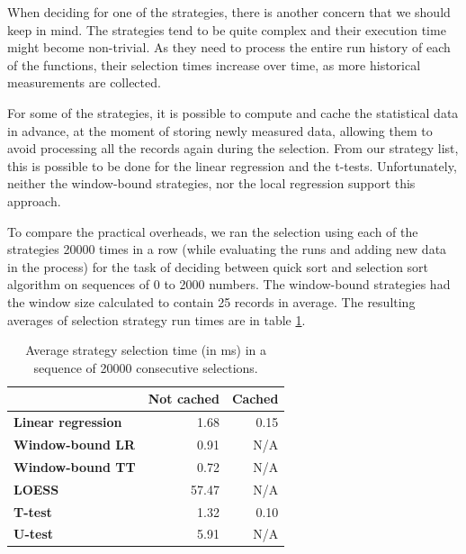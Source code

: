 When deciding for one of the strategies, there is another concern that we should keep in mind. The strategies tend to be quite complex and their execution time might become non-trivial. As they need to process the entire run history of each of the functions, their selection times increase over time, as more historical measurements are collected.

For some of the strategies, it is possible to compute and cache the statistical data in advance, at the moment of storing newly measured data, allowing them to avoid processing all the records again during the selection. From our strategy list, this is possible to be done for the linear regression and the t-tests. Unfortunately, neither the window-bound strategies, nor the local regression support this approach.

To compare the practical overheads, we ran the selection using each of the strategies 20000 times in a row (while evaluating the runs and adding new data in the process) for the task of deciding between quick sort and selection sort algorithm on sequences of 0 to 2000 numbers. The window-bound strategies had the window size calculated to contain 25 records in average. The resulting averages of selection strategy run times are in table \ref{tab:strategy_execution_comparison}.

\begin{table}[h!]
	\captionsetup{justification=centering,margin=0.5cm}
	\centering
	\bgroup
	\def\arraystretch{1.5}%
	\begin{tabular}{|l|r|r|}
		\hline
		\textbf{}                  & \multicolumn{1}{l|}{\textbf{Not cached}} & \multicolumn{1}{l|}{\textbf{Cached}} \\ \hline
		\textbf{Linear regression} & 1.68                                     & 0.15                                 \\ \hline
		\textbf{Window-bound LR}   & 0.91                                     & N/A                                  \\ \hline
		\textbf{Window-bound TT}   & 0.72                                     & N/A                                  \\ \hline
		\textbf{LOESS}             & 57.47                                    & N/A                                  \\ \hline
		\textbf{T-test}            & 1.32                                     & 0.10                                 \\ \hline
		\textbf{U-test}            & 5.91                                     & N/A                                  \\ \hline
	\end{tabular}
\egroup
\caption{Average strategy selection time (in ms) in a sequence of 20000 consecutive selections.}
\label{tab:strategy_execution_comparison}
\end{table}


